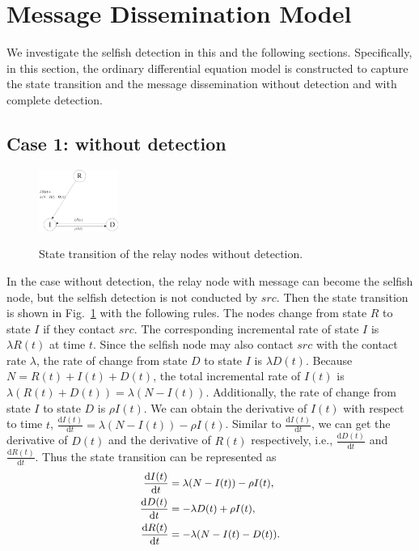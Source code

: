 \section{Message Dissemination Model}
\label{sec:ode_model}
We investigate the selfish detection in this and the following sections.
Specifically, in this section, the ordinary differential equation model
is constructed to capture the state transition and the message dissemination
without detection and with complete detection.
\subsection{Case 1: without detection}
\label{subsec:wo_detc}
\begin{figure}
  \centering
  {\includegraphics[width=0.23\textwidth]
  {fig/state_transition_no_detect.eps}}
     \caption{State transition of the relay nodes without detection.}
     \label{fig:ss_wo_dt}
\end{figure}
In the case without detection,
the relay node with message can become the selfish node,
but the selfish detection is not conducted by $src$.
Then the state transition is shown
in Fig.~\ref{fig:ss_wo_dt} with the following rules.
The nodes change from state $R$ to state $I$ if they contact $src$.
The corresponding incremental rate
of state $I$ is $\lambda R(t)$ at time $t$.
Since the selfish node may also contact
$src$ with the contact rate $\lambda$,
the rate of change from state $D$
to state $I$ is $\lambda D(t)$.
Because $N=R(t)+I(t)+D(t)$,
the total incremental rate of $I(t)$ is
$\lambda \left( R(t)+D(t) \right) = \lambda \left( N-I(t) \right)$.
Additionally, the rate of change
from state $I$ to state $D$ is $\rho I(t)$.
We can obtain the derivative of $I(t)$ with respect to time $t$,
$\frac{\mathrm{d} I(t)}{\mathrm{d} t} = \lambda (N-I(t)) - \rho I(t)$.
Similar to $\frac{\mathrm{d} I(t)}{\mathrm{d} t}$,
we can get the derivative of $D(t)$
and the derivative of $R(t)$ respectively,
i.e., $\frac{\mathrm{d} D(t)}{\mathrm{d} t}$ and
$\frac{\mathrm{d} R(t)}{\mathrm{d} t}$.
Thus the state transition can be represented as
\begin{equation}
\begin{small}
\label{eq:IDR_wo}
\begin{aligned}
\frac{\mathrm{d} I(t)}{\mathrm{d} t} &=  \lambda (N-I(t)) - \rho I(t),\\
\frac{\mathrm{d} D(t)}{\mathrm{d} t} &= - \lambda D(t) + \rho I(t),\\
\frac{\mathrm{d} R(t)}{\mathrm{d} t} &= - \lambda (N-I(t)-D(t)).
\end{aligned}
\end{small}
\end{equation}
